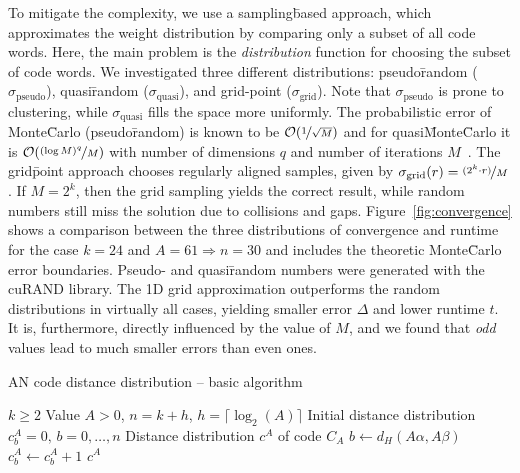 To mitigate the complexity, we use a sampling\=based approach, which approximates the weight distribution by comparing only a subset of all code words. Here, the main problem is the \emph{distribution} function for choosing the subset of code words. We investigated three different distributions: pseudo\=random (\(\sigma_\text{pseudo}\)), quasi\=random (\(\sigma_\text{quasi}\)), and grid-point (\(\sigma_\text{grid}\)). Note that \(\sigma_\text{pseudo}\) is prone to clustering, while \(\sigma_\text{quasi}\) fills the space more uniformly. The probabilistic error of Monte\=Carlo (pseudo\=random) is known to be $\mathcal{O}(\nicefrac{1}{\sqrt{M}})$ and for quasi\=Monte\=Carlo it is $\mathcal{O}(\nicefrac{(\log M)^q}{M})$ with number of dimensions $q$ and number of iterations $M$~\cite{montecarlo}. The grid\=point approach chooses regularly aligned samples, given by $\sigma_\text{grid}(r) = \nicefrac{(2^k\cdot r)}{M}$. If $M=2^k$, then the grid sampling yields the correct result, while random numbers still miss the solution due to collisions and gaps. Figure~\ref{fig:convergence} shows a comparison between the three distributions of convergence and runtime for the case \(k=24\) and \(A=61 \Rightarrow n=30\) and includes the theoretic Monte\=Carlo error boundaries. Pseudo- and quasi\=random numbers were generated with the cuRAND library. The 1D grid approximation outperforms the random distributions in virtually all cases, yielding smaller error \(\Delta\) and lower runtime \(t\). It is, furthermore, directly influenced by the value of \(M\), and we found that \emph{odd} values lead to much smaller errors than even ones.

\begin{algorithm}[t]
\caption{AN code distance distribution -- basic algorithm}
\label{alg:ancoding}
\begin{algorithmic}[1]
\Require $k\ge2$
\Require Value $A>0$, $n=k+h$, $h=\lceil\log_2(A)\rceil$
\Require Initial distance distribution $c^A_b=0,\,b=0,\ldots,n$
\Ensure Distance distribution $c^A$ of code $C_A$
  \label{alg:ancoding:1}
   \label{alg:ancoding:2}
 \State $b \gets d_H( A\alpha, A\beta )$
 \State $c^A_b \gets c^A_b + 1$  \label{alg:ancoding:4}
\EndFor
\EndFor
\State \Return $c^A$
\end{algorithmic}
\end{algorithm}

